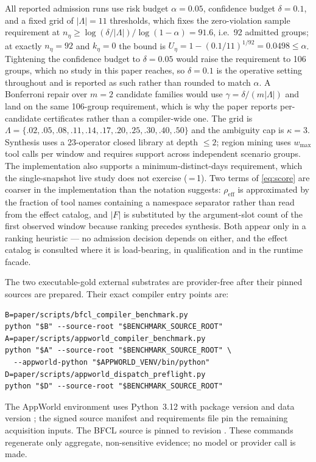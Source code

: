 All reported admission runs use risk budget $\alpha=0.05$, confidence budget
$\delta=0.1$, and a fixed grid of $|\Lambda|=11$ thresholds, which fixes the
zero-violation sample requirement at
$n_\eta\ge\log(\delta/|\Lambda|)/\log(1-\alpha)=91.6$, i.e.\ 92 admitted
groups; at exactly $n_\eta=92$ and $k_\eta=0$ the bound is
$U_\eta=1-(0.1/11)^{1/92}=0.0498\le\alpha$. Tightening the confidence budget to
$\delta=0.05$ would raise the requirement to 106 groups, which no study in this
paper reaches, so $\delta=0.1$ is the operative setting throughout and is
reported as such rather than rounded to match $\alpha$. A Bonferroni repair over
$m=2$ candidate families would use $\gamma=\delta/(m|\Lambda|)$ and land on the
same 106-group requirement, which is why the paper reports per-candidate
certificates rather than a compiler-wide one. The grid is
$\Lambda=\{.02,.05,.08,.11,.14,.17,.20,.25,.30,.40,.50\}$ and the ambiguity cap
is $\kappa=3$.
Synthesis uses a 23-operator closed library at depth $\le 2$; region mining
uses $w_{\max}$ tool calls per window and requires support across independent
scenario groups. The implementation also supports a minimum-distinct-days
requirement, which the single-snapshot live study does not exercise
(\,=\,1). Two terms of \cref{eq:score} are coarser in the
implementation than the notation suggests: $\rho_{\mathrm{eff}}$ is
approximated by the fraction of tool names containing a namespace separator
rather than read from the effect catalog, and $|F|$ is substituted by the
argument-slot count of the first observed window because ranking precedes
synthesis. Both appear only in a ranking heuristic --- no admission decision
depends on either, and the effect catalog is consulted where it is load-bearing,
in qualification and in the runtime facade.

The two executable-gold external substrates are provider-free after their pinned
sources are prepared. Their exact compiler entry points are:
\begin{verbatim}
B=paper/scripts/bfcl_compiler_benchmark.py
python "$B" --source-root "$BENCHMARK_SOURCE_ROOT"
A=paper/scripts/appworld_compiler_benchmark.py
python "$A" --source-root "$BENCHMARK_SOURCE_ROOT" \
  --appworld-python "$APPWORLD_VENV/bin/python"
D=paper/scripts/appworld_dispatch_preflight.py
python "$D" --source-root "$BENCHMARK_SOURCE_ROOT"
\end{verbatim}
The AppWorld environment uses Python~3.12 with package version
 and data version ; the signed source manifest and
requirements file pin the remaining acquisition inputs. The BFCL source is pinned
to revision \code{6ea57973c7a6}. These commands regenerate only aggregate,
non-sensitive evidence; no model or provider call is made.

